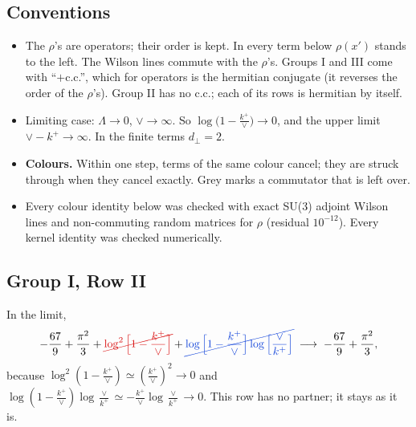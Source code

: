 \documentclass[9pt]{article}
\newcommand{\R}[1]{{\color{cR}#1}}
\newcommand{\B}[1]{{\color{cB}#1}}
\newcommand{\Gr}[1]{{\color{cX}#1}}
\numberwithin{equation}{section}
\begin{document}
\subsection{Conventions}
\begin{itemize}
\item The $\rho$'s are operators; their order is kept. In every term below $\rho(x')$ stands to the left. The Wilson lines commute with the $\rho$'s. Groups I and III come with ``$+$c.c.'', which for operators is the hermitian conjugate (it reverses the order of the $\rho$'s). Group II has no c.c.; each of its rows is hermitian by itself.
\item Limiting case: $\Lambda\to0$, $\vee\to\infty$. So $\log\big(1-\frac{k^{+}}{\vee}\big)\to0$, and the upper limit $\vee-k^{+}\to\infty$. In the finite terms $d_{\perp}=2$.
\item \textbf{Colours.} Within one step, terms of the same colour cancel; they are struck through when they cancel exactly. \Gr{Grey} marks a commutator that is left over.
\item Every colour identity below was checked with exact SU(3) adjoint Wilson lines and non-commuting random matrices for $\rho$ (residual $10^{-12}$). Every kernel identity was checked numerically.
\end{itemize}

\subsection{Group I, Row II}
In the limit,
\begin{equation}
-\frac{67}{9}+\frac{\pi^{2}}{3}+\R{\cancel{\log^{2}\Big[1-\frac{k^{+}}{\vee}\Big]}}+\B{\cancel{\log\Big[1-\frac{k^{+}}{\vee}\Big]\log\Big[\frac{\vee}{k^{+}}\Big]}}\;\longrightarrow\;-\frac{67}{9}+\frac{\pi^{2}}{3},
\end{equation}
because $\log^{2}(1-\frac{k^{+}}{\vee})\simeq(\frac{k^{+}}{\vee})^{2}\to0$ and $\log(1-\frac{k^{+}}{\vee})\log\frac{\vee}{k^{+}}\simeq-\frac{k^{+}}{\vee}\log\frac{\vee}{k^{+}}\to0$. This row has no partner; it stays as it is.
\end{document}

